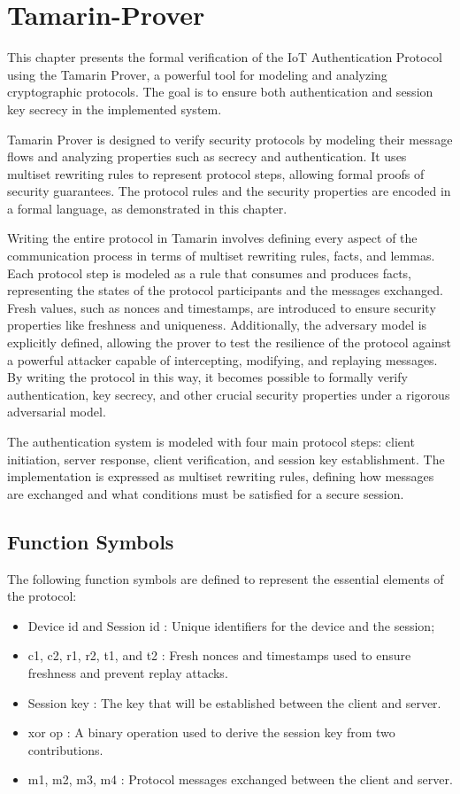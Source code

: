 \section{Tamarin-Prover}
This chapter presents the formal verification of the IoT Authentication Protocol using the Tamarin Prover, a powerful tool for modeling and analyzing cryptographic protocols. The goal is to ensure both authentication and session key secrecy in the implemented system.

Tamarin Prover is designed to verify security protocols by modeling their message flows and analyzing properties such as secrecy and authentication. It uses multiset rewriting rules to represent protocol steps, allowing formal proofs of security guarantees. The protocol rules and the security properties are encoded in a formal language, as demonstrated in this chapter.

Writing the entire protocol in Tamarin involves defining every aspect of the communication process in terms of multiset rewriting rules, facts, and lemmas. Each protocol step is modeled as a rule that consumes and produces facts, representing the states of the protocol participants and the messages exchanged. Fresh values, such as nonces and timestamps, are introduced to ensure security properties like freshness and uniqueness. Additionally, the adversary model is explicitly defined, allowing the prover to test the resilience of the protocol against a powerful attacker capable of intercepting, modifying, and replaying messages. By writing the protocol in this way, it becomes possible to formally verify authentication, key secrecy, and other crucial security properties under a rigorous adversarial model.

The authentication system is modeled with four main protocol steps: client initiation, server response, client verification, and session key establishment. The implementation is expressed as multiset rewriting rules, defining how messages are exchanged and what conditions must be satisfied for a secure session.

\subsection{Function Symbols}
The following function symbols are defined to represent the essential elements of the protocol:
\begin{itemize}
    \item Device id and Session id : Unique identifiers for the device and the session;
    \item c1, c2, r1, r2, t1, and t2 : Fresh nonces and timestamps used to ensure freshness and prevent replay attacks.
    \item Session key : The key that will be established between the client and server.
    \item xor op : A binary operation used to derive the session key from two contributions.
    \item m1, m2, m3, m4 : Protocol messages exchanged between the client and server.
\end{itemize}


